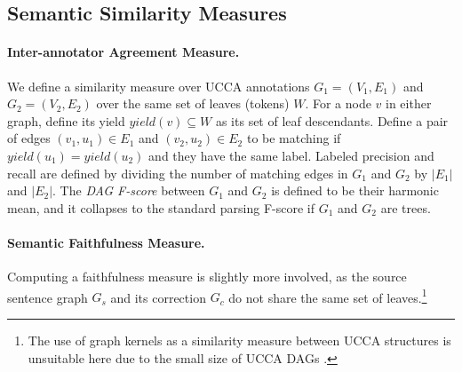 \documentclass[letter,11pt]{article}
\begin{document}
\subsection{Semantic Similarity Measures}

\paragraph{Inter-annotator Agreement Measure.} We define a similarity measure over UCCA annotations 
$G_1=(V_1,E_1)$ and $G_2=(V_2,E_2)$ over the same set of leaves (tokens) $W$.
For a node $v$ in either graph, define its yield $yield(v) \subseteq W$ as its
set of leaf descendants.
Define a pair of edges $(v_1,u_1) \in E_1$ and $(v_2,u_2) \in E_2$ to be matching
if $yield(u_1) = yield(u_2)$ and they have the same label.
Labeled precision and recall are defined by dividing the number of matching edges
in $G_1$ and $G_2$ by $|E_1|$ and $|E_2|$.
The {\it DAG F-score} between $G_1$ and $G_2$ is defined to be their harmonic mean,
and it collapses to the standard parsing F-score if $G_1$ and $G_2$ are trees.

\paragraph{Semantic Faithfulness Measure.} Computing a faithfulness
measure is slightly more involved, as the source sentence graph $G_s$ and its
correction $G_c$ do not share the same set of
leaves.\footnote{The use of graph kernels as a similarity measure between UCCA 
  structures is unsuitable here due to the small size of UCCA DAGs \cite{kashima2003marginalized}.} 


\end{document}
